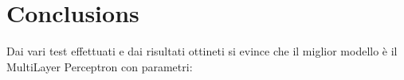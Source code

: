 \section{Conclusions}

        Dai vari test effettuati e dai risultati ottineti si evince che il miglior modello è il MultiLayer Perceptron con parametri:
        